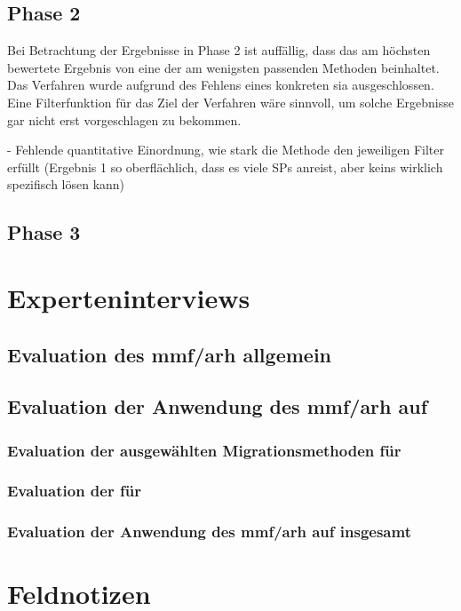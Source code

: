 \subsection{Phase 2}

Bei Betrachtung der Ergebnisse in Phase 2 ist auffällig, dass das am höchsten bewertete Ergebnis von  eine der am wenigsten passenden Methoden beinhaltet.
Das Verfahren wurde aufgrund des Fehlens eines konkreten \gls{sia} ausgeschlossen.
Eine Filterfunktion für das Ziel der Verfahren wäre sinnvoll, um solche Ergebnisse gar nicht erst vorgeschlagen zu bekommen.

 - Fehlende quantitative Einordnung, wie stark die Methode den jeweiligen Filter erfüllt (Ergebnis 1 so oberflächlich, dass es viele SPs anreist, aber keins wirklich spezifisch lösen kann)

\subsection{Phase 3}


\section{Experteninterviews}

\subsection{Evaluation des \gls{mmf}/\gls{arh} allgemein}
\label{sec:evaluation-mmf-allgemein}
\subsection{Evaluation der Anwendung des \gls{mmf}/\gls{arh} auf \jf}
\label{sec:evaluation-mmf-anwendung}

\subsubsection{Evaluation der ausgewählten Migrationsmethoden für \jf}
\label{sec:evaluation-mmf-anwendung-methoden}
\subsubsection{Evaluation der \bpp für \jf}
\label{sec:evaluation-mmf-anwendung-bp-patterns}
\subsubsection{Evaluation der Anwendung des \gls{mmf}/\gls{arh} auf \jf insgesamt}
\label{sec:evaluation-mmf-anwendung-insgesamt}

\section{Feldnotizen}

